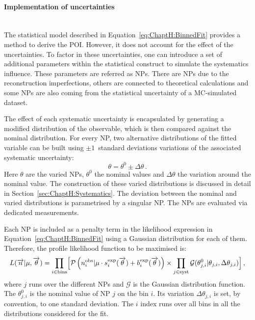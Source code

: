 \paragraph{Implementation of uncertainties}\mbox{}\\
The statistical model described in Equation~\ref{eq:ChaptH:BinnedFit} provides a method to derive the POI.
However, it does not account for the effect of the uncertainties. 
To factor in these uncertainties, one can introduce a set of additional parameters within the 
statistical construct to simulate the systematics influence. These parameters are referred 
as NPs. There are NPs due to the reconstruction imperfections, others 
are connected to theoretical calculations and some NPs are also coming from the 
statistical uncertainty of a MC-simulated dataset.

The effect of each systematic uncertainty is encapsulated by generating a 
modified distribution of the observable, which is then compared against the 
nominal distribution.
For every NP, two alternative distributions of the fitted variable can be built using
$\pm 1$~standard deviations variations of the associated systematic uncertainty:
\begin{equation*}
\theta= \theta^{0} \pm \Delta\theta \, .
\end{equation*}
Here $\theta$ are the varied NPs, $\theta^{0}$ the nominal values and $\Delta\theta$ the variation
around the nominal value.
 The construction of  these varied distributions is
discussed in detail in Section~\ref{sec:ChaptH:Systematics}.
The deviation between the nominal and varied distributions is parametrised 
by a singular NP. The NPs are evaluated via dedicated measurements. 


Each NP is included as a penalty term in the likelihood expression in Equation~\ref{eq:ChaptH:BinnedFit} 
using a Gaussian distribution for each of them. 
Therefore, the profile likelihood function to be maximised is:
\begin{equation*}
	L(\overrightarrow{n}|\mu, \overrightarrow{\theta}) 
	= \prod_{i \in \text{bins}} \Bigl[ \mathcal{P}\left(n_{i}^{\text{obs}} | \mu \cdot s_{i}^{\text{exp}}(\overrightarrow{\theta}) + b_{i}^{\text{exp}}(\overrightarrow{\theta})\right)
	\times \prod_{j \in \text{syst}} \mathcal{G}(\theta^{0}_{j,i}|\theta_{j,i}, \Delta \theta_{j,i})\Bigr]\, ,
\end{equation*}
where $j$ runs over the different NPs and $\mathcal{G}$ is the Gaussian distribution function. The $\theta^{0}_{j,i}$ is
the nominal value of NP $j$ on the bin $i$. Its variation $\Delta \theta_{j,i}$ is set, by 
convention, to one standard deviation. The $i$ index runs over all bins in all the distributions considered for the fit.


